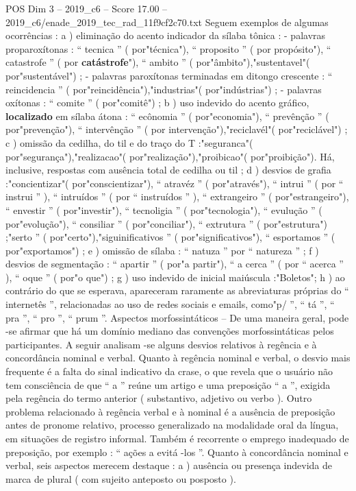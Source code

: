 \begin{textsample}{POS Dim 3 – 2019\_c6 – Score 17.00 – 2019\_c6/enade\_2019\_tec\_rad\_11f9cf2c70.txt}
Seguem exemplos de algumas ocorrências : a ) eliminação do acento indicador da sílaba tônica : - palavras proparoxítonas : “ tecnica ” ( por"técnica"), “ proposito ” ( por propósito"), “ catastrofe ” ( por \textbf{catástrofe}"), “ ambito ” ( por"âmbito"),"sustentavel"( por"sustentável") ; - palavras paroxítonas terminadas em ditongo crescente : “ reincidencia ” ( por"reincidência"),"industrias"( por"indústrias") ; - palavras oxítonas : “ comite ” ( por"comitê") ; b ) uso indevido do acento gráfico, \textbf{localizado} em sílaba átona : “ ecônomia ” ( por"economia"), “ prevênção ” ( por"prevenção"), “ intervênção ” ( por intervenção"),"reciclavél"( por"reciclável") ; c ) omissão da cedilha, do til e do traço do T :"seguranca"( por"segurança"),"realizacao"( por"realização"),"proibicao"( por"proibição").
Há, inclusive, respostas com ausência total de cedilha ou til ; d ) desvios de grafia :"concientizar"( por"conscientizar"), “ atravéz ” ( por"através"), “ intrui ” ( por “ instrui ” ), “ intruídos ” ( por “ instruídos ” ), “ extrangeiro ” ( por"estrangeiro"), “ envestir ” ( por"investir"), “ tecnoligia ” ( por"tecnologia"), “ evulução ” ( por"evolução"), “ consiliar ” ( por"conciliar"), “ extrutura ” ( por"estrutura") ;"serto ” ( por"certo"),"siguinificativos ” ( por"significativos"), “ esportamos ” ( por"exportamos") ; e ) omissão de sílaba : “ natuza ” por “ natureza ” ; f ) desvios de segmentação : “ apartir ” ( por"a partir"), “ a cerca ” ( por “ acerca ” ), “ oque ” ( por"o que") ; g ) uso indevido de inicial maiúscula :"Boletos"; h ) ao contrário do que se esperava, apareceram raramente as abreviaturas próprias do “ internetês ”, relacionadas ao uso de redes sociais e emails, como"p/ ”, “ tá ”, “ pra ”, “ pro ”, “ prum ”.
Aspectos morfossintáticos – De uma maneira geral, pode -se afirmar que há um domínio mediano das convenções morfossintáticas pelos participantes.
A seguir analisam -se alguns desvios relativos à regência e à concordância nominal e verbal.
Quanto à regência nominal e verbal, o desvio mais frequente é a falta do sinal indicativo da crase, o que revela que o usuário não tem consciência de que “ a ” reúne um artigo e uma preposição “ a ”, exigida pela regência do termo anterior ( substantivo, adjetivo ou verbo ).
Outro problema relacionado à regência verbal e à nominal é a ausência de preposição antes de pronome relativo, processo generalizado na modalidade oral da língua, em situações de registro informal.
Também é recorrente o emprego inadequado de preposição, por exemplo : “ ações a evitá -los ”.
Quanto à concordância nominal e verbal, seis aspectos merecem destaque : a ) ausência ou presença indevida de marca de plural ( com sujeito anteposto ou posposto ).

\end{textsample}
